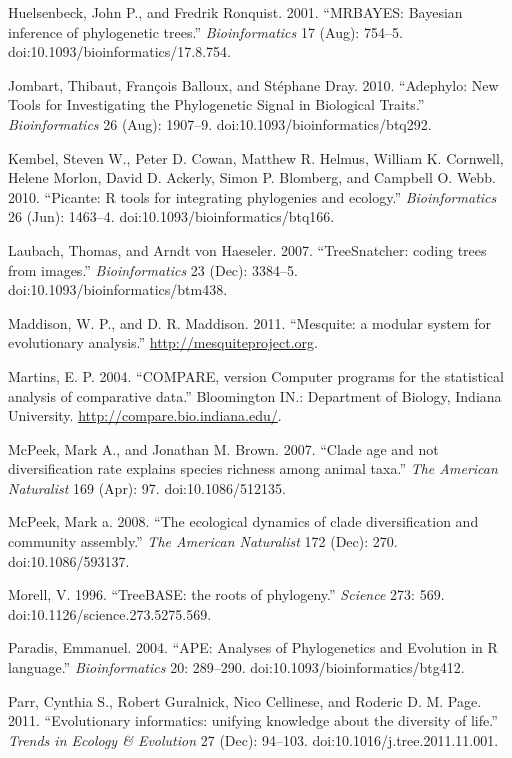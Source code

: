 \documentclass[author-year, 8pt, 3p]{elsarticle} %
\begin{document}
Huelsenbeck, John P., and Fredrik Ronquist. 2001. ``MRBAYES: Bayesian
inference of phylogenetic trees.'' \emph{Bioinformatics} 17 (Aug):
754--5. doi:10.1093/bioinformatics/17.8.754.

Jombart, Thibaut, François Balloux, and Stéphane Dray. 2010. ``Adephylo:
New Tools for Investigating the Phylogenetic Signal in Biological
Traits.'' \emph{Bioinformatics} 26 (Aug): 1907--9.
doi:10.1093/bioinformatics/btq292.

Kembel, Steven W., Peter D. Cowan, Matthew R. Helmus, William K.
Cornwell, Helene Morlon, David D. Ackerly, Simon P. Blomberg, and
Campbell O. Webb. 2010. ``Picante: R tools for integrating phylogenies
and ecology.'' \emph{Bioinformatics} 26 (Jun): 1463--4.
doi:10.1093/bioinformatics/btq166.

Laubach, Thomas, and Arndt von Haeseler. 2007. ``TreeSnatcher: coding
trees from images.'' \emph{Bioinformatics} 23 (Dec): 3384--5.
doi:10.1093/bioinformatics/btm438.

Maddison, W. P., and D. R. Maddison. 2011. ``Mesquite: a modular system
for evolutionary analysis.''
\href{http://mesquiteproject.org}{http://mesquiteproject.org}.

Martins, E. P. 2004. ``COMPARE, version Computer programs for the
statistical analysis of comparative data.'' Bloomington IN.: Department
of Biology, Indiana University.
\href{http://compare.bio.indiana.edu/}{http://compare.bio.indiana.edu/}.

McPeek, Mark A., and Jonathan M. Brown. 2007. ``Clade age and not
diversification rate explains species richness among animal taxa.''
\emph{The American Naturalist} 169 (Apr): 97. doi:10.1086/512135.

McPeek, Mark a. 2008. ``The ecological dynamics of clade diversification
and community assembly.'' \emph{The American Naturalist} 172 (Dec): 270.
doi:10.1086/593137.

Morell, V. 1996. ``TreeBASE: the roots of phylogeny.'' \emph{Science}
273: 569. doi:10.1126/science.273.5275.569.

Paradis, Emmanuel. 2004. ``APE: Analyses of Phylogenetics and Evolution
in R language.'' \emph{Bioinformatics} 20: 289--290.
doi:10.1093/bioinformatics/btg412.

Parr, Cynthia S., Robert Guralnick, Nico Cellinese, and Roderic D. M.
Page. 2011. ``Evolutionary informatics: unifying knowledge about the
diversity of life.'' \emph{Trends in Ecology \& Evolution} 27 (Dec):
94--103. doi:10.1016/j.tree.2011.11.001.
\end{document}

